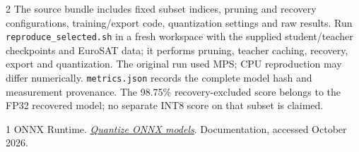 \documentclass[10pt,letterpaper]{article}
\newcommand{\code}[1]{\texttt{\small #1}}
\begin{document}
\begin{multicols}{2}
The source bundle includes fixed subset indices, pruning and recovery configurations, training/export code, quantization settings and raw results. Run \code{reproduce\_selected.sh} in a fresh workspace with the supplied student/teacher checkpoints and EuroSAT data; it performs pruning, teacher caching, recovery, export and quantization. The original run used MPS; CPU reproduction may differ numerically. \code{metrics.json} records the complete model hash and measurement provenance. The 98.75\% recovery-excluded score belongs to the FP32 recovered model; no separate INT8 score on that subset is claimed.
\vspace{-3pt}
\begin{thebibliography}{1}\small\setlength{\itemsep}{1pt}\setlength{\parskip}{0pt}
 ONNX Runtime. \href{https://onnxruntime.ai/docs/performance/model-optimizations/quantization.html}{\emph{Quantize ONNX models}}. Documentation, accessed October 2026.
\end{thebibliography}
\end{multicols}
\end{document}
